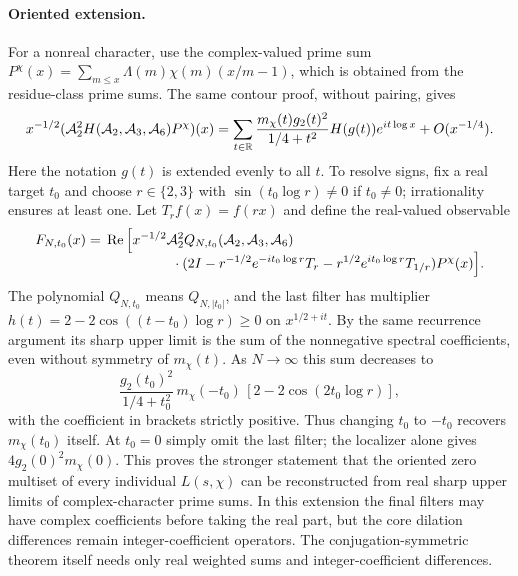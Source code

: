 \documentclass[11pt]{article}
\theoremstyle{remark}\newtheorem{remark}[theorem]{Remark}
\newcommand{\Rea}{\operatorname{Re}}\newcommand{\ord}{\operatorname{ord}}
\newcommand{\A}{\mathcal A}
\begin{document}
\paragraph{Oriented extension.} For a nonreal character, use the complex-valued prime sum $P^{\chi}(x)=\sum_{m\le x}\Lambda(m)\chi(m)(x/m-1)$, which is obtained from the residue-class prime sums. The same contour proof, without pairing, gives
\[
 x^{-1/2}(\A_2^2 H(\A_2,\A_3,\A_6)P^\chi)(x)
 =\sum_{t\in\R}\frac{m_\chi(t)g_2(t)^2}{1/4+t^2}H(g(t))e^{it\log x}
 +O(x^{-1/4}).
\]
Here the notation $g(t)$ is extended evenly to all $t$. To resolve signs, fix a real target $t_0$ and choose $r\in\{2,3\}$ with $\sin(t_0\log r)\ne0$ if $t_0\ne0$; irrationality ensures at least one. Let $T_rf(x)=f(rx)$ and define the real-valued observable
\begin{align*}
 F_{N,t_0}(x)={}&\Rea\Big[x^{-1/2}\A_2^2 Q_{N,t_0}(\A_2,\A_3,\A_6)\,\\[-5pt]
 &\hspace{17mm}\cdot (2I-r^{-1/2}e^{-it_0\log r}T_r
       -r^{1/2}e^{it_0\log r}T_{1/r})P^\chi(x)\Big].
\end{align*}
The polynomial $Q_{N,t_0}$ means $Q_{N,|t_0|}$, and the last filter has multiplier $h(t)=2-2\cos((t-t_0)\log r)\ge0$ on $x^{1/2+it}$. By the same recurrence argument its sharp upper limit is the sum of the nonnegative spectral coefficients, even without symmetry of $m_\chi(t)$. As $N\to\infty$ this sum decreases to
\[
 \frac{g_2(t_0)^2}{1/4+t_0^2}\,m_\chi(-t_0)\,[2-2\cos(2t_0\log r)],
\]
with the coefficient in brackets strictly positive. Thus changing $t_0$ to $-t_0$ recovers $m_\chi(t_0)$ itself. At $t_0=0$ simply omit the last filter; the localizer alone gives $4g_2(0)^2m_\chi(0)$. This proves the stronger statement that the oriented zero multiset of every individual $L(s,\chi)$ can be reconstructed from real sharp upper limits of complex-character prime sums. In this extension the final filters may have complex coefficients before taking the real part, but the core dilation differences remain integer-coefficient operators. The conjugation-symmetric theorem itself needs only real weighted sums and integer-coefficient differences.
\end{document}
